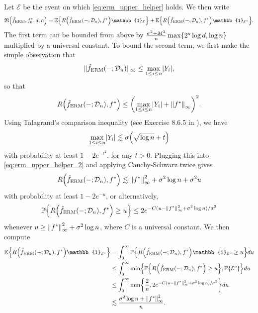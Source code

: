 \documentclass[11pt]{article}
\DeclarePairedDelimiter{\braces}{\lbrace}{\rbrace}
\DeclarePairedDelimiter{\paren}{(}{)}
\DeclarePairedDelimiter{\abs}{|}{|}
\DeclarePairedDelimiter{\norm}{\|}{\|}
\renewcommand{\P}{\mathbb{P}}
\newcommand{\E}{\mathbb{E}}
\newcommand{\indicator}{\mathbb{1}}
\newcommand{\sparsity}{s}
\newcommand{\nfeats}{d}
\newcommand{\nsamples}{n}
\newcommand{\data}[1][n]{\mathcal{D}_{#1}}
\newcommand{\ferm}{\hat{f}_{\operatorname{ERM}}}
\newcommand{\objective}{\mathfrak{R}}
\begin{document}
Let $\mathcal{E}$ be the event on which \eqref{eq:erm_upper_helper} holds.
    We then write
    \begin{equation}
        \objective\paren*{\ferm, f^*_0,\nfeats,\nsamples} = \E\braces*{R\paren*{\ferm(-;\data),f^*}\indicator_\mathcal{E}} + \E\braces*{R\paren*{\ferm(-;\data),f^*}\indicator_{\mathcal{E}^c}}.
    \end{equation}
    The first term can be bounded from above by $\frac{\sigma^2 + M^2}{\nsamples}\max\braces*{2^\sparsity\log\nfeats,\log\nsamples}$ multiplied by a universal constant.
    To bound the second term, we first make the simple observation that 
    \begin{equation}
        \|\ferm(-;\data)\|_{\infty} \leq \max_{1 \leq i \leq \nsamples} \abs*{Y_i}, 
    \end{equation}
    so that
    \begin{equation}
    \label{eq:erm_upper_helper_2}
        R\paren*{\ferm(-;\data),f^*} \leq \paren*{\max_{1 \leq i \leq \nsamples} \abs*{Y_i} + \norm*{f^*}_\infty}^2.
    \end{equation}
    Using Talagrand's comparison inequality (see Exercise 8.6.5 in \cite{vershynin2018high}), we have
    \begin{equation}
        \max_{1 \leq i \leq \nsamples} \abs*{Y_i} \lesssim \sigma\paren*{\sqrt{\log \nsamples} + t}
    \end{equation}
    with probability at least $1-2e^{-t^2}$, for any $t > 0$.
    Plugging this into \eqref{eq:erm_upper_helper_2} and applying Cauchy-Schwarz twice gives
    \begin{equation}
        R\paren*{\ferm(-;\data),f^*} \lesssim \norm*{f^*}_\infty^2 + \sigma^2\log\nsamples + \sigma^2u
    \end{equation}
    with probability at least $1 - 2e^{-u}$, or alternatively,
    \begin{equation}
        \P\braces*{R\paren*{\ferm(-;\data),f^*} \geq u } \leq 2e^{-C(u-\norm{f^*}_\infty^2 + \sigma^2\log\nsamples)/\sigma^2}
    \end{equation}
    whenever $u \geq \norm*{f^*}_\infty^2 + \sigma^2\log\nsamples$, where $C$ is a universal constant.
    We then compute
    \begin{equation}
        \begin{split}
            \E\braces*{R\paren*{\ferm(-;\data),f^*}\indicator_{\mathcal{E}^c}} & = \int_0^\infty \P\braces*{R\paren*{\ferm(-;\data),f^*}\indicator_{\mathcal{E}^c} \geq u} du \\
            & \leq \int_0^\infty \min\braces*{\P\braces*{R\paren*{\ferm(-;\data),f^*} \geq u},\P\braces*{\mathcal{E}^c}} du \\
            & \leq \int_0^\infty \min\braces*{\frac{2}{n},2e^{-C(u-\norm{f^*}_\infty^2 + \sigma^2\log\nsamples)/\sigma^2}} du \\
            & \lesssim \frac{\sigma^2\log\nsamples + \norm*{f^*}_\infty^2}{\nsamples}.
        \end{split}
    \end{equation}
\end{document}
